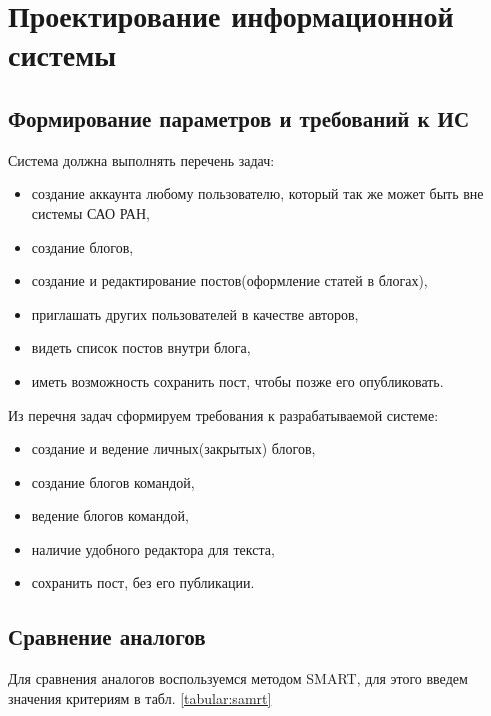 \section{Проектирование информационной системы}

\subsection{Формирование параметров и требований к ИС}
Система должна выполнять перечень задач:
\begin{itemize}
	\item создание аккаунта любому пользователю, который так же может быть вне системы САО РАН, 
	\item создание блогов,
	\item создание и редактирование постов(оформление статей в блогах),
	\item приглашать других пользователей в качестве авторов,
	\item видеть список постов внутри блога,
	\item иметь возможность сохранить пост, чтобы позже его опубликовать. 
\end{itemize}

Из перечня задач сформируем требования к разрабатываемой системе:
\begin{itemize}
	\item создание и ведение личных(закрытых) блогов,
	\item создание блогов командой,
	\item ведение блогов командой,
	\item наличие удобного редактора для текста,
	\item сохранить пост, без его публикации. 
\end{itemize}

\pagebreak
\subsection{Сравнение аналогов}
Для сравнения аналогов воспользуемся методом SMART, для этого введем значения критериям в табл. \ref{tabular:samrt}

